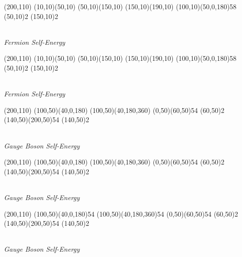 \documentclass{article}
\begin{document}
\begin{center}
\begin{axopicture}(200,110)
\Line[arrow](10,10)(50,10)
\Line[arrow](50,10)(150,10)
\Line[arrow](150,10)(190,10)
\PhotonArc(100,10)(50,0,180){5}{8}
\Vertex(50,10){2}
\Vertex(150,10){2}
\end{axopicture}
\\{\sl Fermion Self-Energy }
\end{center}

\begin{center}
	\begin{axopicture}(200,110)
		\Line[arrow](10,10)(50,10)
		\Line[arrow](50,10)(150,10)
		\Line[arrow](150,10)(190,10)
		\GluonArc(100,10)(50,0,180){5}{8}
		\Vertex(50,10){2}
		\Vertex(150,10){2}
	\end{axopicture}
	\\{\sl Fermion Self-Energy }
\end{center}

\begin{center}
  \begin{axopicture}(200,110)
	\Arc[arrow](100,50)(40,0,180)
	\Arc[arrow](100,50)(40,180,360)
	\Gluon(0,50)(60,50){5}{4}
	\Vertex(60,50){2} 
	\Gluon(140,50)(200,50){5}{4}
	\Vertex(140,50){2}
\end{axopicture}
	\\{\sl Gauge Boson Self-Energy }
\end{center}	
	
\begin{center}
	\begin{axopicture}(200,110)
		\Arc[arrow](100,50)(40,0,180)
		\Arc[arrow](100,50)(40,180,360)
		\Photon(0,50)(60,50){5}{4}
		\Vertex(60,50){2} 
		\Photon(140,50)(200,50){5}{4}
		\Vertex(140,50){2}
	\end{axopicture}
	\\{\sl Gauge Boson Self-Energy }
\end{center}

\begin{center}
	\begin{axopicture}(200,110)
		\GluonArc(100,50)(40,0,180){5}{4}
		\GluonArc(100,50)(40,180,360){5}{4}
		\Gluon(0,50)(60,50){5}{4}
		\Vertex(60,50){2} 
		\Gluon(140,50)(200,50){5}{4}
		\Vertex(140,50){2}
	\end{axopicture}
	\\{\sl Gauge Boson Self-Energy }
\end{center}
\end{document}
